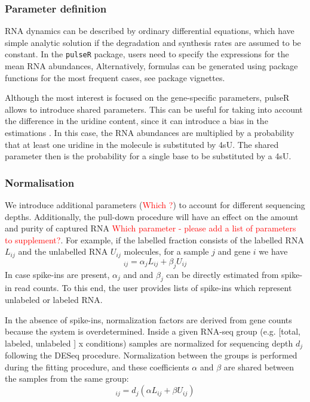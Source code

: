 \subsubsection*{Parameter definition}
RNA dynamics can be described by ordinary differential equations,
which have simple analytic solution 
if the degradation and synthesis rates are assumed to be constant.
In the \verb|pulseR| package,
users need to specify the expressions for the mean RNA abundances,
Alternatively, formulas can be generated using package functions for the 
most frequent cases, see package vignettes. 

Although the most interest is focused on the gene-specific parameters,
pulseR allows to introduce shared parameters.
 This can be useful for taking into account the difference in the uridine content, since
it can introduce a bias in the estimations \citep{miller2011dynamic,
schwalb2012measurement}.
In this case, the RNA abundances are multiplied by 
a probability that at least one uridine in the molecule is substituted by 4sU.
The shared parameter then is the probability for a single base to be substituted
by a 4sU.
\subsubsection*{Normalisation}
We introduce additional parameters (\textcolor{red}{Which ?}) to account for different sequencing depths.
Additionally, the pull-down procedure will have an effect on the amount and purity of captured RNA \textcolor{red}{Which parameter - please add a list of parameters to supplement?}. 
 For example, 
if the labelled fraction consists of the labelled RNA $L_{ij}$ and the unlabelled RNA
 $U_{ij}$ molecules, for a sample $j$ and gene $i$ we have 
\begin{equation}
 [\text{labelled fraction}]_{ij}  = \alpha_{j} L_{ij} + \beta_{j} U_{ij}
\end{equation}
In case spike-ins are present, $\alpha_{j}$ and and $\beta_j$ can be directly estimated from spike-in read counts. 
To this end, the user provides lists of spike-ins which represent unlabeled or labeled RNA.
\par
In the absence of spike-ins, 
normalization factors are derived from gene counts
because the system is overdetermined.
Inside a given RNA-seq group (e.g. [total, labeled, unlabeled ] x conditions) samples are normalized for sequencing depth $d_j$ following the DESeq procedure.
Normalization between the groups is performed during the fitting procedure, 
and these coefficients $\alpha$ and $\beta$ are shared between the samples from the same group:
\begin{equation}
 [\text{labelled fraction}]_{ij}  = d_j(\alpha L_{ij} + \beta U_{ij})
\end{equation}

